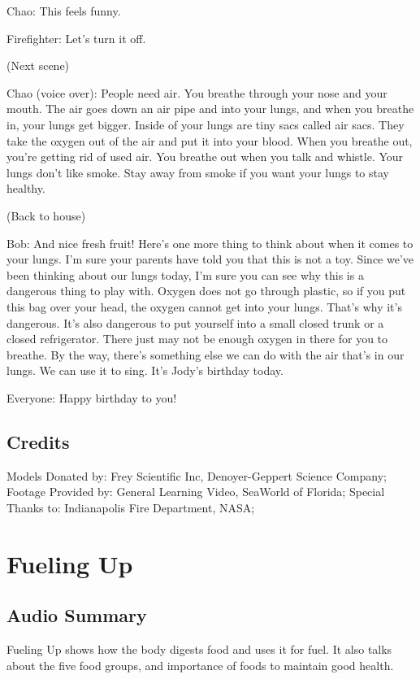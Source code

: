 Chao: This feels funny.

Firefighter: Let's turn it off.

(Next scene)

Chao (voice over): People need air. You breathe through your nose and your mouth. The air goes down an air pipe and into your lungs, and when you breathe in, your lungs get bigger. Inside of your lungs are tiny sacs called air sacs. They take the oxygen out of the air and put it into your blood. When you breathe out, you're getting rid of used air. You breathe out when you talk and whistle. Your lungs don't like smoke. Stay away from smoke if you want your lungs to stay healthy.

(Back to house)

Bob: And nice fresh fruit! Here's one more thing to think about when it comes to your lungs. I'm sure your parents have told you that this is not a toy. Since we've been thinking about our lungs today, I'm sure you can see why this is a dangerous thing to play with. Oxygen does not go through plastic, so if you put this bag over your head, the oxygen cannot get into your lungs. That's why it's dangerous. It's also dangerous to put yourself into a small closed trunk or a closed refrigerator. There just may not be enough oxygen in there for you to breathe. By the way, there's something else we can do with the air that's in our lungs. We can use it to sing. It's Jody's birthday today.

Everyone: Happy birthday to you!

\subsection{Credits}

Models Donated by: Frey Scientific Inc, Denoyer-Geppert Science Company;
Footage Provided by: General Learning Video, SeaWorld of Florida;
Special Thanks to: Indianapolis Fire Department, NASA;

\section{Fueling Up}

\subsection{Audio Summary}

Fueling Up shows how the body digests food and uses it for fuel. It also talks about the five food groups, and importance of foods to maintain good health.

